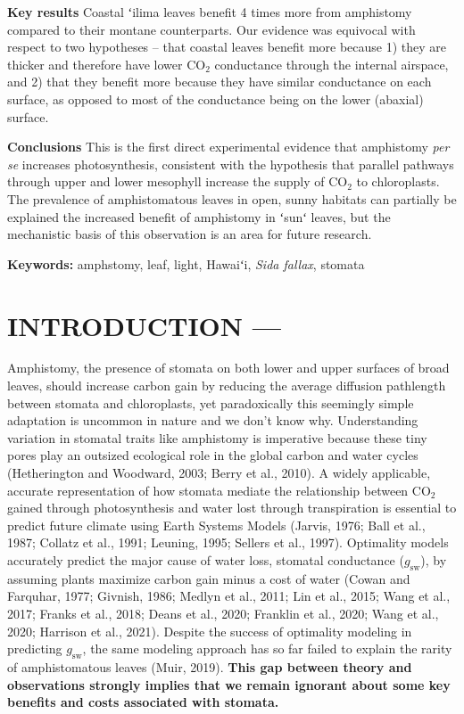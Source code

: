 \documentclass[
  letterpaper,
  DIV=11,
  numbers=noendperiod]{scrartcl}
\begin{document}
\textbf{Key results} Coastal ʻilima leaves benefit 4 times more from
amphistomy compared to their montane counterparts. Our evidence was
equivocal with respect to two hypotheses -- that coastal leaves benefit
more because 1) they are thicker and therefore have lower CO\(_2\)
conductance through the internal airspace, and 2) that they benefit more
because they have similar conductance on each surface, as opposed to
most of the conductance being on the lower (abaxial) surface.

\textbf{Conclusions} This is the first direct experimental evidence that
amphistomy \emph{per se} increases photosynthesis, consistent with the
hypothesis that parallel pathways through upper and lower mesophyll
increase the supply of CO\(_2\) to chloroplasts. The prevalence of
amphistomatous leaves in open, sunny habitats can partially be explained
the increased benefit of amphistomy in ʻsunʻ leaves, but the mechanistic
basis of this observation is an area for future research.

\textbf{Keywords:} amphstomy, leaf, light, Hawaiʻi, \emph{Sida fallax},
stomata

\hypertarget{introduction}{%
\section{INTRODUCTION ---}\label{introduction}}

Amphistomy, the presence of stomata on both lower and upper surfaces of
broad leaves, should increase carbon gain by reducing the average
diffusion pathlength between stomata and chloroplasts, yet paradoxically
this seemingly simple adaptation is uncommon in nature and we don't know
why. Understanding variation in stomatal traits like amphistomy is
imperative because these tiny pores play an outsized ecological role in
the global carbon and water cycles (Hetherington and Woodward, 2003;
Berry et al., 2010). A widely applicable, accurate representation of how
stomata mediate the relationship between CO\(_2\) gained through
photosynthesis and water lost through transpiration is essential to
predict future climate using Earth Systems Models (Jarvis, 1976; Ball et
al., 1987; Collatz et al., 1991; Leuning, 1995; Sellers et al., 1997).
Optimality models accurately predict the major cause of water loss,
stomatal conductance (\(g_\mathrm{sw}\)), by assuming plants maximize
carbon gain minus a cost of water (Cowan and Farquhar, 1977; Givnish,
1986; Medlyn et al., 2011; Lin et al., 2015; Wang et al., 2017; Franks
et al., 2018; Deans et al., 2020; Franklin et al., 2020; Wang et al.,
2020; Harrison et al., 2021). Despite the success of optimality modeling
in predicting \(g_\mathrm{sw}\), the same modeling approach has so far
failed to explain the rarity of amphistomatous leaves (Muir, 2019).
\textbf{This gap between theory and observations strongly implies that
we remain ignorant about some key benefits and costs associated with
stomata.}
\end{document}
